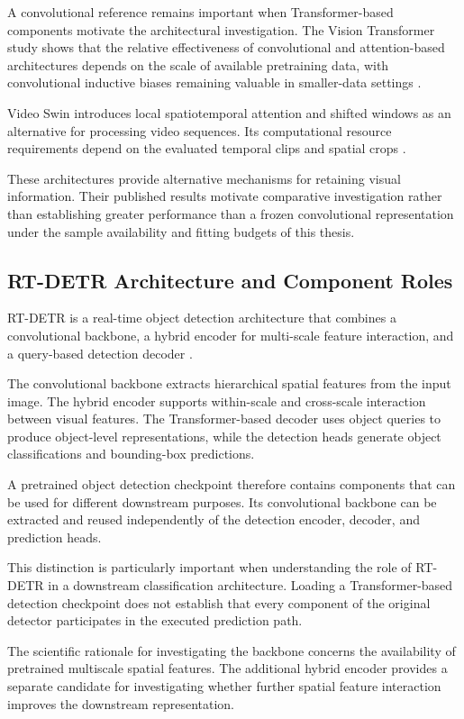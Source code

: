 A convolutional reference remains important when Transformer-based components motivate the architectural investigation. The Vision Transformer study shows that the relative effectiveness of convolutional and attention-based architectures depends on the scale of available pretraining data, with convolutional inductive biases remaining valuable in smaller-data settings \parencite{P010}.

Video Swin introduces local spatiotemporal attention and shifted windows as an alternative for processing video sequences. Its computational resource requirements depend on the evaluated temporal clips and spatial crops \parencite{P013}.

These architectures provide alternative mechanisms for retaining visual information. Their published results motivate comparative investigation rather than establishing greater performance than a frozen convolutional representation under the sample availability and fitting budgets of this thesis.

\subsection{RT-DETR Architecture and Component Roles}

RT-DETR is a real-time object detection architecture that combines a convolutional backbone, a hybrid encoder for multi-scale feature interaction, and a query-based detection decoder \parencite{Zhao2024RTDETR}.

The convolutional backbone extracts hierarchical spatial features from the input image. The hybrid encoder supports within-scale and cross-scale interaction between visual features. The Transformer-based decoder uses object queries to produce object-level representations, while the detection heads generate object classifications and bounding-box predictions.

A pretrained object detection checkpoint therefore contains components that can be used for different downstream purposes. Its convolutional backbone can be extracted and reused independently of the detection encoder, decoder, and prediction heads.

This distinction is particularly important when understanding the role of RT-DETR in a downstream classification architecture. Loading a Transformer-based detection checkpoint does not establish that every component of the original detector participates in the executed prediction path.

The scientific rationale for investigating the backbone concerns the availability of pretrained multiscale spatial features. The additional hybrid encoder provides a separate candidate for investigating whether further spatial feature interaction improves the downstream representation.

